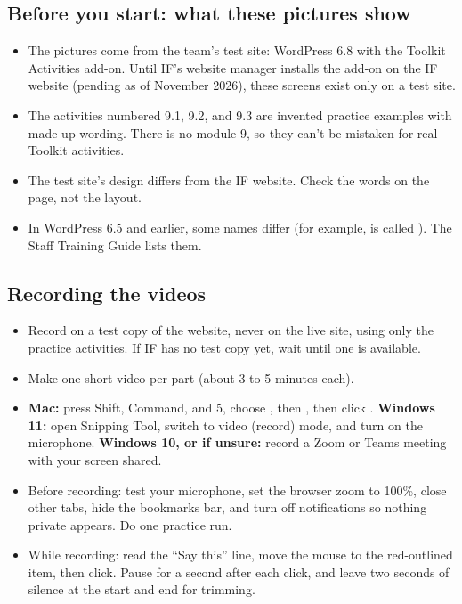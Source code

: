 \subsection*{Before you start: what these pictures show}
\begin{itemize}
  \item The pictures come from the team's test site: WordPress 6.8 with the Toolkit Activities add-on. Until IF's website manager installs the add-on on the IF website (pending as of November 2026), these screens exist only on a test site.
  \item The activities numbered 9.1, 9.2, and 9.3 are invented practice examples with made-up wording. There is no module 9, so they can't be mistaken for real Toolkit activities.
  \item The test site's design differs from the IF website. Check the words on the page, not the layout.
  \item In WordPress 6.5 and earlier, some names differ (for example,  is called ). The Staff Training Guide lists them.
\end{itemize}

\subsection*{Recording the videos}
\begin{itemize}
  \item Record on a test copy of the website, never on the live site, using only the practice activities. If IF has no test copy yet, wait until one is available.
  \item Make one short video per part (about 3 to 5 minutes each).
  \item \textbf{Mac:} press Shift, Command, and 5, choose , then , then click . \textbf{Windows 11:} open Snipping Tool, switch to video (record) mode, and turn on the microphone. \textbf{Windows 10, or if unsure:} record a Zoom or Teams meeting with your screen shared.
  \item Before recording: test your microphone, set the browser zoom to 100\%, close other tabs, hide the bookmarks bar, and turn off notifications so nothing private appears. Do one practice run.
  \item While recording: read the ``Say this'' line, move the mouse to the red-outlined item, then click. Pause for a second after each click, and leave two seconds of silence at the start and end for trimming.
\end{itemize}

